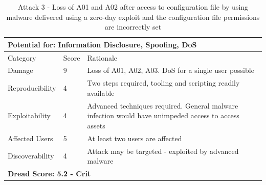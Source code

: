 \documentclass [11pt, proquest] {uwthesis}[2020/02/24]
\begin{document}
\setlength{\belowcaptionskip}{-10pt}
\begin{table}[H]
\begin{tabular}{|m{3cm}|m{1cm}|p{27em} |}
\multicolumn{3}{l}{Potential for: Information Disclosure, Spoofing, DoS}                   \\
\hline
Category & Score & Rationale \\
\hline
Damage          & 9     & Loss of A01, A02, A03. DoS for a single user possible            \\
\hline
Reproducibility & 4     & Two steps required, tooling and scripting readily available    \\
\hline
Exploitability & 4      & Advanced techniques required. General malware infection would have unimpeded access to access assets  \\
\hline
Affected Users  & 5     & At least two users are affected                      \\
\hline
Discoverability & 4     & Attack may be targeted - exploited by advanced malware \\
\hline
\multicolumn{3}{l}{\textbf{Dread Score: 5.2 - Crit}} 
\end{tabular}
\caption{Attack 3 - Loss of A01 and A02 after access to configuration file by using malware delivered using a zero-day exploit and the configuration file permissions are incorrectly set}
\setlength{\belowcaptionskip}{-10pt}
\label{ref:attack3}
\end{table}
\end{document}
